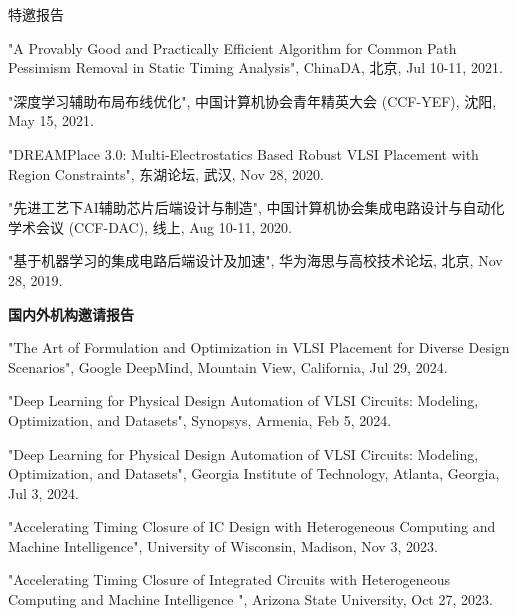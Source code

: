 \begin{rSection}{特邀报告}
\begin{description}[font=\normalfont]
\item[{[T5]}]{
"A Provably Good and Practically Efficient Algorithm for Common Path Pessimism Removal in Static Timing Analysis", ChinaDA, 北京, Jul 10-11, 2021. 
}

\item[{[T4]}]{
"深度学习辅助布局布线优化", 中国计算机协会青年精英大会 (CCF-YEF), 沈阳, May 15, 2021. 
}

\item[{[T3]}]{
"DREAMPlace 3.0: Multi-Electrostatics Based Robust VLSI Placement with Region Constraints", 东湖论坛, 武汉, Nov 28, 2020.
}

\item[{[T2]}]{
"先进工艺下AI辅助芯片后端设计与制造", 中国计算机协会集成电路设计与自动化学术会议 (CCF-DAC), 线上, Aug 10-11, 2020. 
}

\item[{[T1]}]{
"基于机器学习的集成电路后端设计及加速", 华为海思与高校技术论坛, 北京, Nov 28, 2019. 
}

\end{description}

\textbf{国内外机构邀请报告}
        
\begin{description}[font=\normalfont]

\item[{[T11]}]{
    "The Art of Formulation and Optimization in VLSI Placement for Diverse Design Scenarios", Google DeepMind, Mountain View, California, Jul 29, 2024. 
}

\item[{[T10]}]{
    "Deep Learning for Physical Design Automation of VLSI Circuits: Modeling, Optimization, and Datasets", Synopsys, Armenia, Feb 5, 2024. 
}

\item[{[T9]}]{
    "Deep Learning for Physical Design Automation of VLSI Circuits: Modeling, Optimization, and Datasets", Georgia Institute of Technology, Atlanta, Georgia, Jul 3, 2024. 
}

\item[{[T8]}]{
    "Accelerating Timing Closure of IC Design with Heterogeneous Computing and Machine Intelligence", University of Wisconsin, Madison, Nov 3, 2023. 
}

\item[{[T7]}]{
    "Accelerating Timing Closure of Integrated Circuits with Heterogeneous Computing and Machine Intelligence ", Arizona State University, Oct 27, 2023. 
}


\end{description}
\end{rSection}

